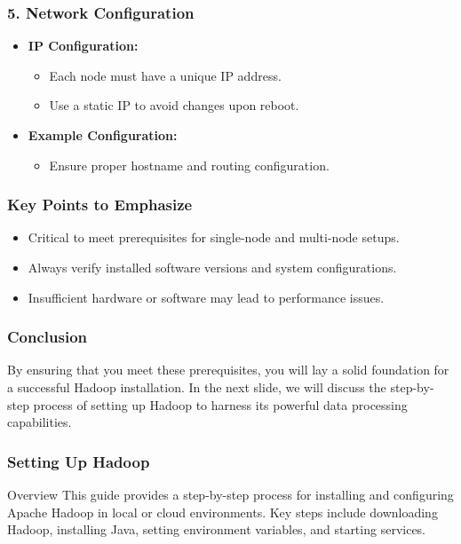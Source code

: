 \documentclass{beamer}
\begin{document}
\begin{frame}[fragile]
    \frametitle{5. Network Configuration}
    \begin{itemize}
        \item \textbf{IP Configuration:}
            \begin{itemize}
                \item Each node must have a unique IP address.
                \item Use a static IP to avoid changes upon reboot.
            \end{itemize}
        \item \textbf{Example Configuration:}
            \begin{itemize}
                \item Ensure proper hostname and routing configuration.
            \end{itemize}
    \end{itemize}
\end{frame}

\begin{frame}[fragile]
    \frametitle{Key Points to Emphasize}
    \begin{itemize}
        \item Critical to meet prerequisites for single-node and multi-node setups.
        \item Always verify installed software versions and system configurations.
        \item Insufficient hardware or software may lead to performance issues.
    \end{itemize}
\end{frame}

\begin{frame}[fragile]
    \frametitle{Conclusion}
    By ensuring that you meet these prerequisites, you will lay a solid foundation for a successful Hadoop installation. 
    In the next slide, we will discuss the step-by-step process of setting up Hadoop to harness its powerful data processing capabilities.
\end{frame}

\begin{frame}
    \frametitle{Setting Up Hadoop}
    \begin{block}{Overview}
        This guide provides a step-by-step process for installing and configuring Apache Hadoop in local or cloud environments. 
        Key steps include downloading Hadoop, installing Java, setting environment variables, and starting services.
    \end{block}
\end{frame}
\end{document}
